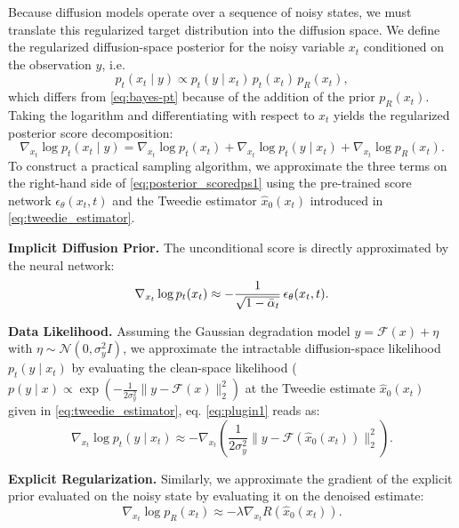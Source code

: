 \documentclass[a4paper,11pt]{article}
\renewcommand{\varepsilon}{\epsilon}
\theoremstyle{definition}
\theoremstyle{plain}
\theoremstyle{remark}
\begin{document}
Because diffusion models operate over a sequence of noisy states, we must translate this regularized target distribution into the diffusion space. We define the regularized diffusion-space posterior for the noisy variable $x_t$ conditioned on the observation $y$, i.e.
\begin{equation}	
	\label{eq:preg}
	p_t(x_t \mid y) \propto p_t(y \mid x_t)\,p_t(x_t)\,p_R(x_t),
\end{equation}
which  differs from \eqref{eq:bayes-pt} because of the addition of the prior $p_R(x_t)$.
Taking the logarithm and differentiating with respect to $x_t$ yields the regularized posterior score decomposition:
\begin{equation}
	\label{eq:posterior_scoredps1}
	\nabla_{x_t} \log p_t(x_t \mid y)
	=
	\nabla_{x_t} \log p_t(x_t)
	+
	\nabla_{x_t} \log p_t(y \mid x_t)
	+
	\nabla_{x_t} \log p_R(x_t).
\end{equation}
To construct a practical sampling algorithm, we approximate the three terms on the right-hand side of \eqref{eq:posterior_scoredps1} using the pre-trained score network $\varepsilon_\theta(x_t,t)$ and the Tweedie estimator $\hat{x}_0(x_t)$ introduced in \eqref{eq:tweedie_estimator}.

\noindent \textbf{Implicit Diffusion Prior.} The unconditional score is directly approximated by the neural network:
	\begin{equation}\notag
		\nabla_{x_t}\log p_t(x_t) \approx -\frac{1}{\sqrt{1-\bar\alpha_t}}\,\varepsilon_\theta(x_t,t).
	\end{equation}
	
\noindent \textbf{Data Likelihood.} Assuming the Gaussian degradation model $y = \mathcal{F}(x) + \eta$ with $\eta \sim \mathcal{N}(0,\sigma_y^2 I)$, we approximate the intractable diffusion-space likelihood $p_t(y \mid x_t)$ by evaluating the clean-space likelihood  ($ p(y \mid x)  \propto \exp \left(- \frac{1}{2\sigma_y^2}\|y-\mathcal{F}(x)\|_2^2 \right) $ at the Tweedie estimate $\hat{x}_0(x_t)$ given in \eqref{eq:tweedie_estimator}, eq. \eqref{eq:plugin1} reads as:
	 \begin{equation}\label{eq:plugin2}
	 	\nabla_{x_t}\log p_t(y \mid x_t) \approx - \nabla_{x_t} \left( \frac{1}{2\sigma_y^2}\|y-\mathcal{F}(\hat{x}_0(x_t))\|_2^2 \right).
	 \end{equation}
	
\noindent \textbf{Explicit Regularization.} Similarly, we approximate the gradient of the explicit prior evaluated on the noisy state by evaluating it on the denoised estimate:
	\begin{equation}
		\label{eq:reg}
		\nabla_{x_t}\log p_R(x_t) \approx -\lambda \nabla_{x_t} R(\hat{x}_0(x_t)).
	\end{equation}
\end{document}
